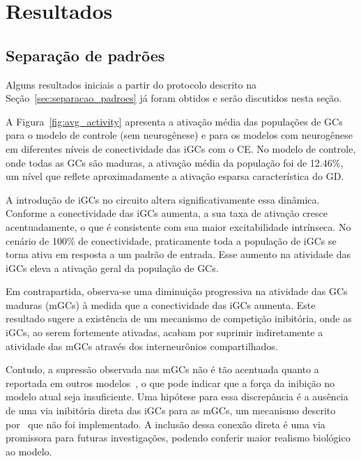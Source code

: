 \chapter{Resultados}

\section{Separação de padrões}


Alguns resultados iniciais a partir do protocolo descrito na Seção~\ref{sec:separacao_padroes} já foram obtidos e serão discutidos
nesta seção.

A Figura~\ref{fig:avg_activity} apresenta a ativação média das populações de GCs para o modelo de controle (sem neurogênese) e
para os modelos com neurogênese em diferentes níveis de conectividade das iGCs com o CE. No modelo de controle, onde todas as GCs
são maduras, a ativação média da população foi de 12.46\%, um nível que reflete aproximadamente a ativação esparsa característica
do GD.

A introdução de iGCs no circuito altera significativamente essa dinâmica. Conforme a conectividade das iGCs aumenta, a sua taxa de
ativação cresce acentuadamente, o que é consistente com sua maior excitabilidade intrínseca. No cenário de 100\% de conectividade,
praticamente toda a população de iGCs se torna ativa em resposta a um padrão de entrada. Esse aumento na atividade das iGCs eleva
a ativação geral da população de GCs.

Em contrapartida, observa-se uma diminuição progressiva na atividade das GCs maduras (mGCs) à medida que a conectividade das iGCs
aumenta. Este resultado sugere a existência de um mecanismo de competição inibitória, onde as iGCs, ao serem fortemente ativadas,
acabam por suprimir indiretamente a atividade das mGCs através dos interneurônios compartilhados.

Contudo, a supressão observada nas mGCs não é tão acentuada quanto a reportada em outros modelos~\cite{kimEffect2024a}, o que pode
indicar que a força da inibição no modelo atual seja insuficiente. Uma hipótese para essa discrepância é a ausência de uma via
inibitória direta das iGCs para as mGCs, um mecanismo descrito por~ que não foi implementado. A
inclusão dessa conexão direta é uma via promissora para futuras investigações, podendo conferir maior realismo biológico ao
modelo.

